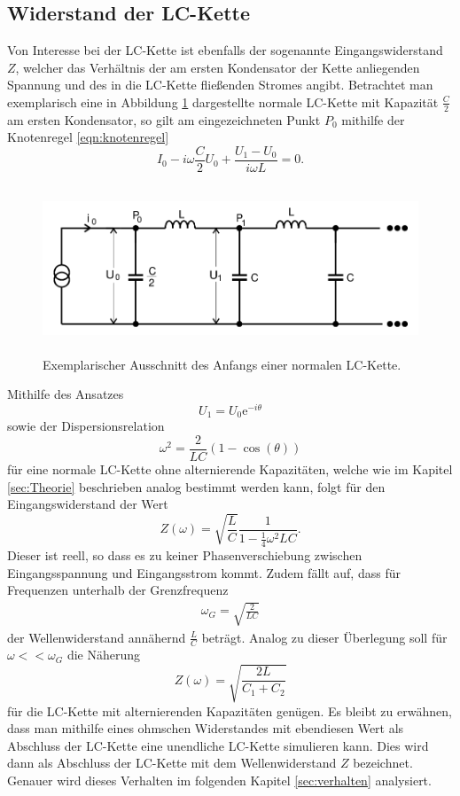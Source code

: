 \subsection{Widerstand der LC-Kette}
\label{sec:widerstand}
Von Interesse bei der LC-Kette ist ebenfalls der sogenannte Eingangswiderstand $Z$, welcher das Verhältnis der am ersten Kondensator der Kette anliegenden Spannung und des in die LC-Kette fließenden Stromes angibt.
Betrachtet man exemplarisch eine in Abbildung \ref{tfig:4} dargestellte normale LC-Kette mit Kapazität $\frac{C}{2}$ am ersten Kondensator, so gilt am eingezeichneten Punkt $P_0$ mithilfe der Knotenregel \eqref{eqn:knotenregel}
\begin{equation}
  I_0 - i \omega \frac{C}{2} U_0 + \frac{U_1 - U_0}{i \omega L} = 0.
\end{equation}
\begin{figure}[H]
  \centering
  \includegraphics[height=5cm]{wellenwiderstand.png}
  \caption{Exemplarischer Ausschnitt des Anfangs einer normalen LC-Kette. \cite{sample}}
  \label{tfig:4}
\end{figure}
Mithilfe des Ansatzes
\begin{equation}
  U_1 = U_0 \mathrm{e}^{-i \theta}
\end{equation}
sowie der Dispersionsrelation
\begin{equation}
  \omega^2 = \frac{2}{LC} (1-\cos{(\theta)})
\end{equation}
für eine normale LC-Kette ohne alternierende Kapazitäten, welche wie im Kapitel \ref{sec:Theorie} beschrieben analog bestimmt werden kann, folgt für den Eingangswiderstand der Wert
\begin{equation}
Z(\omega) = \sqrt{\frac{L}{C}} \frac{1}{1 - \frac{1}{4} \omega^2 L C}.
\end{equation}
Dieser ist reell, so dass es zu keiner Phasenverschiebung zwischen Eingangsspannung und Eingangsstrom kommt.
Zudem fällt auf, dass für Frequenzen unterhalb der Grenzfrequenz
\begin{align*}
  \omega_G = \sqrt{\frac{2}{LC}}
\end{align*}
der Wellenwiderstand annähernd $\frac{L}{C}$ beträgt.
Analog zu dieser Überlegung soll für $\omega << \omega_G$ die Näherung
\begin{equation}
  \label{eqn:irgendwas}
  Z(\omega) = \sqrt{\frac{2L}{C_1 + C_2}}
\end{equation}
für die LC-Kette mit alternierenden Kapazitäten genügen.
Es bleibt zu erwähnen, dass man mithilfe eines ohmschen Widerstandes mit ebendiesen Wert als Abschluss der LC-Kette eine unendliche LC-Kette simulieren kann.
Dies wird dann als Abschluss der LC-Kette mit dem Wellenwiderstand $Z$ bezeichnet.
Genauer wird dieses Verhalten im folgenden Kapitel \ref{sec:verhalten} analysiert.
